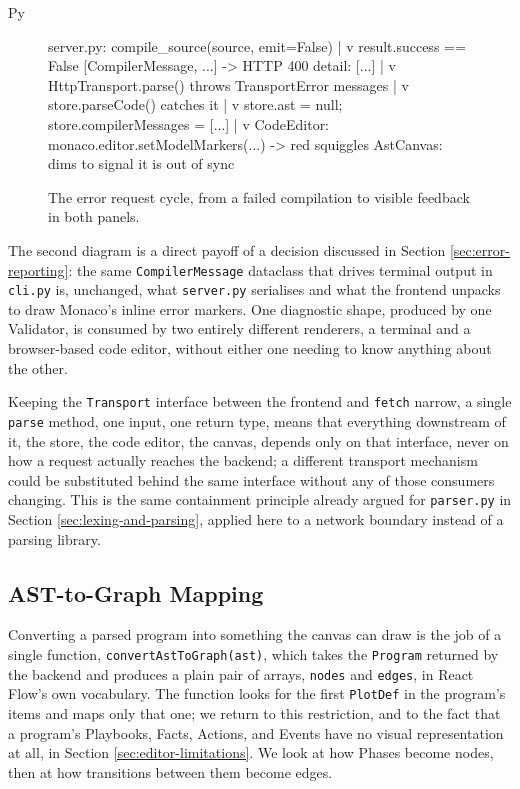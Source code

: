\begin{codeblock}[]{Py}
\begin{figure}[h]
    \centering
    \begin{codeblock}[]{}
server.py: compile_source(source, emit=False)
        |
        v  result.success == False
[CompilerMessage, ...]  ->  HTTP 400 { detail: [...] }
        |
        v
HttpTransport.parse() throws TransportError { messages }
        |
        v
store.parseCode() catches it
        |
        v
store.ast = null;  store.compilerMessages = [...]
        |
        v
CodeEditor: monaco.editor.setModelMarkers(...)  ->  red squiggles
AstCanvas: dims to signal it is out of sync
    \end{codeblock}
    \caption{The error request cycle, from a failed compilation to visible feedback in both panels.}
    \label{fig:editor-error-flow}
\end{figure}

The second diagram is a direct payoff of a decision discussed in Section \ref{sec:error-reporting}: the same \lstinline|CompilerMessage| dataclass that drives terminal output in \lstinline|cli.py| is, unchanged, what \lstinline|server.py| serialises and what the frontend unpacks to draw Monaco's inline error markers. One diagnostic shape, produced by one Validator, is consumed by two entirely different renderers, a terminal and a browser-based code editor, without either one needing to know anything about the other.

Keeping the \lstinline|Transport| interface between the frontend and \lstinline|fetch| narrow, a single \lstinline|parse| method, one input, one return type, means that everything downstream of it, the store, the code editor, the canvas, depends only on that interface, never on how a request actually reaches the backend; a different transport mechanism could be substituted behind the same interface without any of those consumers changing. This is the same containment principle already argued for \lstinline|parser.py| in Section \ref{sec:lexing-and-parsing}, applied here to a network boundary instead of a parsing library.

\subsection{AST-to-Graph Mapping}
\label{sec:ast-to-graph}
Converting a parsed program into something the canvas can draw is the job of a single function, \lstinline|convertAstToGraph(ast)|, which takes the \lstinline|Program| returned by the backend and produces a plain pair of arrays, \lstinline|nodes| and \lstinline|edges|, in React Flow's own vocabulary. The function looks for the first \lstinline|PlotDef| in the program's items and maps only that one; we return to this restriction, and to the fact that a program's Playbooks, Facts, Actions, and Events have no visual representation at all, in Section \ref{sec:editor-limitations}. We look at how Phases become nodes, then at how transitions between them become edges.


\end{codeblock}
